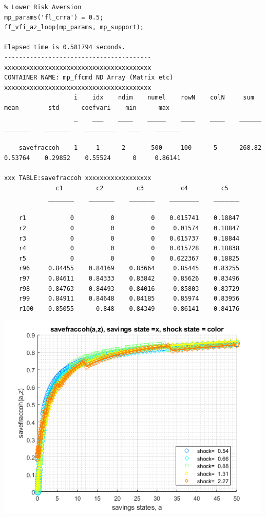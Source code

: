 \documentclass[
]{book}
\begin{document}
\begin{verbatim}
% Lower Risk Aversion
mp_params('fl_crra') = 0.5;
ff_vfi_az_loop(mp_params, mp_support);

Elapsed time is 0.581794 seconds.
----------------------------------------
xxxxxxxxxxxxxxxxxxxxxxxxxxxxxxxxxxxxxxxx
CONTAINER NAME: mp_ffcmd ND Array (Matrix etc)
xxxxxxxxxxxxxxxxxxxxxxxxxxxxxxxxxxxxxxxx
                   i    idx    ndim    numel    rowN    colN     sum       mean        std      coefvari    min      max  
                   _    ___    ____    _____    ____    ____    ______    _______    _______    ________    ___    _______

    savefraccoh    1     1      2       500     100      5      268.82    0.53764    0.29852    0.55524      0     0.86141

xxx TABLE:savefraccoh xxxxxxxxxxxxxxxxxx
              c1         c2         c3          c4         c5   
            _______    _______    _______    ________    _______

    r1            0          0          0    0.015741    0.18847
    r2            0          0          0     0.01574    0.18847
    r3            0          0          0    0.015737    0.18844
    r4            0          0          0    0.015728    0.18838
    r5            0          0          0    0.022367    0.18825
    r96     0.84455    0.84169    0.83664     0.85445    0.83255
    r97     0.84611    0.84333    0.83842     0.85626    0.83496
    r98     0.84763    0.84493    0.84016     0.85803    0.83729
    r99     0.84911    0.84648    0.84185     0.85974    0.83956
    r100    0.85055      0.848    0.84349     0.86141    0.84176
\end{verbatim}

\includegraphics[width=5.20833in,height=\textheight]{img/fx_vfi_az_loop_images/figure_2.png}
\end{document}
